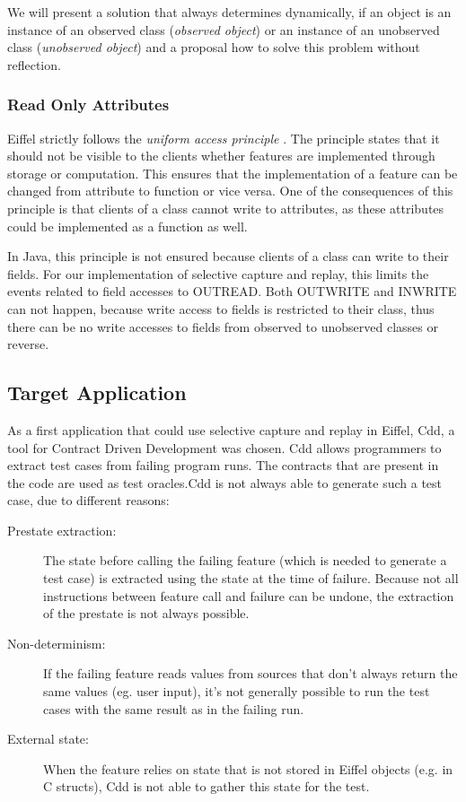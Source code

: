 We will present a solution that always determines dynamically, if an object is an instance of an observed class (\emph{observed object}) or an instance of an unobserved class (\emph{unobserved object}) and a proposal how to solve this problem without reflection.

\subsubsection{Read Only Attributes}
Eiffel strictly follows the \emph{uniform access principle} \cite{oosc2}. The principle states that it should not be visible to the clients whether features are implemented through storage or computation. This ensures that the implementation of a feature can be changed from attribute to function or vice versa. One of the consequences of this principle is that clients of a class cannot write to attributes, as these attributes could be implemented as a function as well.

In Java, this principle is not ensured because clients of a class can write to their fields. For our implementation of selective capture and replay, this limits the events related to field accesses to OUTREAD. Both OUTWRITE and INWRITE can not happen, because write access to fields is restricted to their class, thus there can be no write accesses to fields from observed to unobserved classes or reverse.

\subsection{Target Application}
As a first application that could use selective capture and replay in Eiffel, Cdd, a tool for Contract Driven Development \cite{cdd07} was chosen. Cdd allows programmers to extract test cases from failing program runs. The contracts that are present in the code are used as test oracles.Cdd is not always able to generate such a test case, due to different reasons:

\begin{description}
\item [Prestate extraction:] The state before calling the failing feature (which is needed to generate a test case) is extracted using the state at the time of failure. Because not all instructions between feature call and failure can be undone, the extraction of the prestate is not always possible.
\item [Non-determinism:] If the failing feature reads values from sources that don't always return the same values (eg. user input), it's not generally possible to run the test cases with the same result as in the failing run.
\item [External state:] When the feature relies on state that is not stored in Eiffel objects (e.g. in C structs), Cdd is not able to gather this state for the test.
\end{description}

